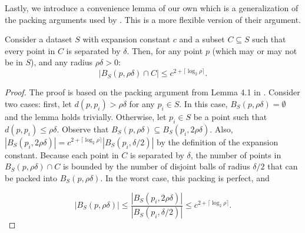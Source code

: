 
Lastly, we introduce a convenience lemma of our own which is a generalization of
the packing arguments used by \citet{langford2006}.  This is a more flexible
version of their argument.

\begin{lemma}
Consider a dataset $S$ with expansion constant $c$ and a subset $C \subseteq S$
such that every point in $C$ is separated by $\delta$.  Then, for any point
$p$ (which may or may not be in $S$), and any radius $\rho \delta > 0$:
\begin{equation}
| B_S(p, \rho \delta) \cap C | \le c^{2 + \lceil \log_2 \rho \rceil}.
\end{equation}
\label{lem:packing}
\end{lemma}

\begin{proof}
The proof is based on the packing argument from Lemma 4.1 in
\cite{langford2006}. Consider two cases: first, let $d(p, p_i) > \rho \delta$
for any $p_i \in S$. In this case, $B_S(p, \rho \delta) = \emptyset$ and the
lemma holds trivially.
Otherwise, let $p_i \in S$ be a point such that $d(p, p_i) \leq \rho \delta$.
Observe that $B_S(p, \rho \delta) \subseteq B_S(p_i, 2 \rho \delta)$.
Also, $| B_S(p_i, 2 \rho \delta) | = c^{2 + \lceil \log_2 \rho
\rceil} | B_S(p_i, \delta / 2) |$ by the definition of the expansion constant.
Because each point in $C$ is separated by $\delta$, the
number of points in $B_S(p, \rho \delta) \cap C$ is
bounded by the number of disjoint balls of radius $\delta / 2$ that can be
packed into $B_S(p, \rho \delta)$.  In the worst case, this packing is
perfect, and

\begin{equation}
|B_S(p, \rho \delta)| \le \frac{|B_S(p_i, 2 \rho \delta)|}{|B_S(p_i, \delta
/ 2)|} \le c^{2 + \lceil \log_2 \rho \rceil}.
\end{equation}
\end{proof}

